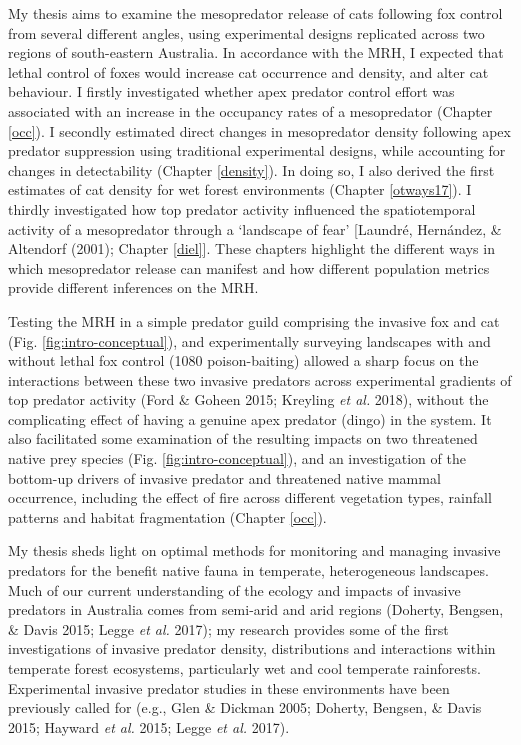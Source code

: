 \documentclass[11pt,a4paper,titlepage,twoside,openright]{style/unimelbthesis}
\begin{document}
\begin{mainmatter}
My thesis aims to examine the mesopredator release of cats following fox control from several different angles, using experimental designs replicated across two regions of south-eastern Australia. In accordance with the MRH, I expected that lethal control of foxes would increase cat occurrence and density, and alter cat behaviour. I firstly investigated whether apex predator control effort was associated with an increase in the occupancy rates of a mesopredator (Chapter \ref{occ}). I secondly estimated direct changes in mesopredator density following apex predator suppression using traditional experimental designs, while accounting for changes in detectability (Chapter \ref{density}). In doing so, I also derived the first estimates of cat density for wet forest environments (Chapter \ref{otways17}). I thirdly investigated how top predator activity influenced the spatiotemporal activity of a mesopredator through a `landscape of fear' {[}Laundré, Hernández, \& Altendorf (2001); Chapter \ref{diel}{]}. These chapters highlight the different ways in which mesopredator release can manifest and how different population metrics provide different inferences on the MRH.

Testing the MRH in a simple predator guild comprising the invasive fox and cat (Fig. \ref{fig:intro-conceptual}), and experimentally surveying landscapes with and without lethal fox control (1080 poison-baiting) allowed a sharp focus on the interactions between these two invasive predators across experimental gradients of top predator activity (Ford \& Goheen 2015; Kreyling \emph{et al.} 2018), without the complicating effect of having a genuine apex predator (dingo) in the system. It also facilitated some examination of the resulting impacts on two threatened native prey species (Fig. \ref{fig:intro-conceptual}), and an investigation of the bottom-up drivers of invasive predator and threatened native mammal occurrence, including the effect of fire across different vegetation types, rainfall patterns and habitat fragmentation (Chapter \ref{occ}).

My thesis sheds light on optimal methods for monitoring and managing invasive predators for the benefit native fauna in temperate, heterogeneous landscapes. Much of our current understanding of the ecology and impacts of invasive predators in Australia comes from semi-arid and arid regions (Doherty, Bengsen, \& Davis 2015; Legge \emph{et al.} 2017); my research provides some of the first investigations of invasive predator density, distributions and interactions within temperate forest ecosystems, particularly wet and cool temperate rainforests. Experimental invasive predator studies in these environments have been previously called for (e.g., Glen \& Dickman 2005; Doherty, Bengsen, \& Davis 2015; Hayward \emph{et al.} 2015; Legge \emph{et al.} 2017).


\end{mainmatter}
\end{document}
